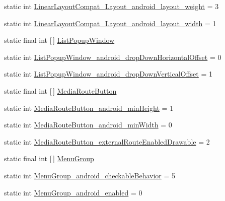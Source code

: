 \begin{DoxyCompactItemize}
\item 
static int \hyperlink{classandroid_1_1support_1_1design_1_1R_1_1styleable_aed3b6a91c687106d85d4ca135edaf54f}{Linear\+Layout\+Compat\+\_\+\+Layout\+\_\+android\+\_\+layout\+\_\+weight} = 3
\item 
static int \hyperlink{classandroid_1_1support_1_1design_1_1R_1_1styleable_a027890dee732cd8c5007dc3a7c54674e}{Linear\+Layout\+Compat\+\_\+\+Layout\+\_\+android\+\_\+layout\+\_\+width} = 1
\item 
static final int \mbox{[}$\,$\mbox{]} \hyperlink{classandroid_1_1support_1_1design_1_1R_1_1styleable_a90ef2283a7dff64bc22eed53a9aa1a73}{List\+Popup\+Window}
\item 
static int \hyperlink{classandroid_1_1support_1_1design_1_1R_1_1styleable_a142528111f7468c14655fbf25419c0f6}{List\+Popup\+Window\+\_\+android\+\_\+drop\+Down\+Horizontal\+Offset} = 0
\item 
static int \hyperlink{classandroid_1_1support_1_1design_1_1R_1_1styleable_a22740fd93f1b8f84c40c5169d6884ff7}{List\+Popup\+Window\+\_\+android\+\_\+drop\+Down\+Vertical\+Offset} = 1
\item 
static final int \mbox{[}$\,$\mbox{]} \hyperlink{classandroid_1_1support_1_1design_1_1R_1_1styleable_a13f16932c8dfbb7db000019830744f57}{Media\+Route\+Button}
\item 
static int \hyperlink{classandroid_1_1support_1_1design_1_1R_1_1styleable_af2cd6575ac0673a2c4446a9f381b1fd5}{Media\+Route\+Button\+\_\+android\+\_\+min\+Height} = 1
\item 
static int \hyperlink{classandroid_1_1support_1_1design_1_1R_1_1styleable_a5b08a856a9c3ae5fb84f939c813f264a}{Media\+Route\+Button\+\_\+android\+\_\+min\+Width} = 0
\item 
static int \hyperlink{classandroid_1_1support_1_1design_1_1R_1_1styleable_a89e09d0e97da9ba4c2c7a8e24b9b4090}{Media\+Route\+Button\+\_\+external\+Route\+Enabled\+Drawable} = 2
\item 
static final int \mbox{[}$\,$\mbox{]} \hyperlink{classandroid_1_1support_1_1design_1_1R_1_1styleable_a39805bd4a947832cbac3bd5f30eef344}{Menu\+Group}
\item 
static int \hyperlink{classandroid_1_1support_1_1design_1_1R_1_1styleable_a1dd1f9ed2abc2955dfb4e3d49f480097}{Menu\+Group\+\_\+android\+\_\+checkable\+Behavior} = 5
\item 
static int \hyperlink{classandroid_1_1support_1_1design_1_1R_1_1styleable_a86f6abd170445535b48efa83a9214c35}{Menu\+Group\+\_\+android\+\_\+enabled} = 0
\item 

\end{DoxyCompactItemize}
